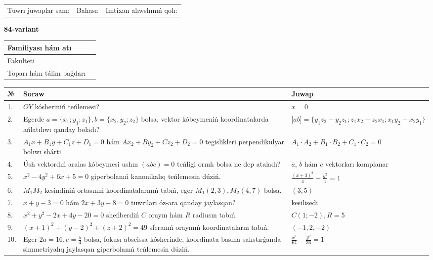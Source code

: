 \documentclass{article}
\begin{document}
\vspace{1cm}

\begin{tabular}{lll}
Tuwrı juwaplar sanı: \underline{\hspace{1.5cm}} & 
Bahası: \underline{\hspace{1.5cm}} & 
Imtixan alıwshınıń qolı: \underline{\hspace{2cm}} \\
\end{tabular}

\egroup

\newpage


\textbf{84-variant}\\

\bgroup
\def\arraystretch{1.6} %

\begin{tabular}{|m{5.7cm}|m{9.5cm}|}
\hline
Familiyası hám atı & \\
\hline
Fakulteti  & \\
\hline
Toparı hám tálim baǵdarı  & \\
\hline
\end{tabular}

\vspace{1cm}

\begin{tabular}{|m{0.7cm}|m{10cm}|m{4cm}|}
\hline
№ & Soraw & Juwap \\
\hline
1. & $OY$ kósheriniń teńlemesi? & $x=0$ \\
\hline
2. & Egerde $a=\{ x_1; y_1; z_1\}, b=\{ x_2, y_2; z_2\}$ bolsa, vektor kóbeymeniń koordinatalarda ańlatılıwı qanday boladı? &  $\lbrack ab\rbrack=\{y_1z_2-y_2z_1; z_1x_2-z_2x_1; x_1y_2-x_2y_1\}$ \\
\hline
3. & $A_1x+B_1y+C_1z+D_1=0$ hám $Ax_2+By_2+Cz_2+D_2=0$ tegislikleri perpendikulyar bolıwı shárti & $A_1\cdot A_2+B_1\cdot B_2+C_1\cdot C_2=0$ \\
\hline
4. & Úsh vektordıń aralas kóbeymesi ushın $(abc)=0$ teńligi orınlı bolsa ne dep ataladı? & $\overline{a}$, $\overline{b}$ hám $\overline{c}$ vektorları komplanar \\
\hline
5. & $x^{2}-4y^{2}+6x+5=0$ giperbolanıń kanonikalıq teńlemesin dúziń. & $\frac{(x+3)^{2}}{4}-\frac{y^{2}}{1}=1$ \\
\hline
6. & $M_{1}M_{2}$ kesindiniń ortasınıń koordinatalarınıń tabıń, eger $M_{1} (2, 3), M_{2} (4, 7)$ bolsa. & $(3,5)$ \\
\hline
7. & $x+y-3=0$ hám $2x+3y-8=0$ tuwrıları óz-ara qanday jaylasqan? & kesilisedi \\
\hline
8. & $x^{2}+y^{2}-2x+4y-20=0$ sheńberdiń $C$ orayın hám $R$ radiusın tabıń. & $C(1;-2), R=5$ \\
\hline
9. & $(x+1)^{2}+(y-2) ^{2}+(z+2) ^{2}=49$ sferanıń orayınıń koordinataların tabıń. & $(-1,2,-2)$ \\
\hline
10. & Eger $2a=16, e=\frac{5}{4}$ bolsa, fokusı abscissa kósherinde, koordinata basına salıstırǵanda simmetriyalıq jaylasqan giperbolanıń teńlemesin dúziń. & $\frac{x^{2}}{64}-\frac{y^{2}}{36}=1$ \\
\hline
\end{tabular}
\end{document}
